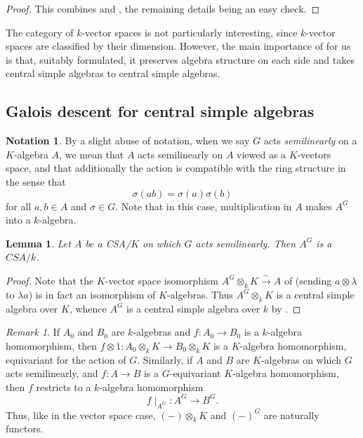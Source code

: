 \documentclass[11pt]{amsart}
\numberwithin{equation}{section}
\newtheorem{lemma}[equation]{Lemma}
\theoremstyle{remark}
\newtheorem{remark}[equation]{Remark}
\theoremstyle{remark}
\theoremstyle{remark}
\theoremstyle{definition}
\theoremstyle{definition}
\theoremstyle{definition}
\theoremstyle{definition}
\newtheorem{notation}[equation]{Notation}
\theoremstyle{definition}
\theoremstyle{definition}
\begin{document}
\begin{proof}
This combines  and , the remaining details being an easy check.
\end{proof}

The category of $k$-vector spaces is not particularly interesting, since $k$-vector spaces are classified by their dimension. However, the main importance of 
 for us is that, suitably formulated, it preserves algebra structure on each side and takes central simple algebras to central simple algebras.

\subsection{Galois descent for central simple algebras}

\begin{notation}
 By a slight abuse of notation, when we say $G$ acts \emph{semilinearly} on a $K$-algebra $A$, we mean that $A$ acts semilinearly on $A$  viewed as a $K$-vectors space, and that additionally the action is compatible with the ring structure in the sense that
 \[\sigma(ab)=\sigma(a)\sigma(b)\]
 for all $a,b\in A$ and $\sigma \in G$. Note that in this case, multiplication in $A$ makes $A^G$ into a $k$-algebra.  
\end{notation}

\begin{lemma} \label{invariants a csa}
Let $A$ be a CSA/$K$ on which $G$ acts semilinearly. Then $A^G$ is a $CSA/k$. 
\end{lemma}

\begin{proof}
Note that the $K$-vector space isomorphism $A^G\otimes_k K\stackrel{\sim}{\longrightarrow} A$ of  (sending $a\otimes \lambda$ to $\lambda a$) is in fact an isomorphism of $K$-algebras. Thus $A^G\otimes _k K$ is a central simple algebra over $K$, whence $A^G$ is a central simple algebra over $k$ by . 
\end{proof}

\begin{remark}
If $A_0$ and $B_0$ are $k$-algebras and $f:A_0\rightarrow B_0$ is a $k$-algebra homomorphism, then $f\otimes 1:A_0\otimes_k K\rightarrow B_0\otimes_k K$ is a $K$-algebra homomorphism, equivariant for the action of $G$. Similarly, if $A$ and $B$ are $K$-algebras on which $G$ acts semilinearly, and $f:A\rightarrow B$ is a $G$-equivariant $K$-algebra homomorphism, then $f$ restricts to a $k$-algebra homomorphism 
\[f\mid_{A^G}:A^G\rightarrow B^G.\]
Thus, like in the vector space case,  $(-)\otimes_k K$ and $(-)^G$ are naturally functors.
\end{remark}
\end{document}
